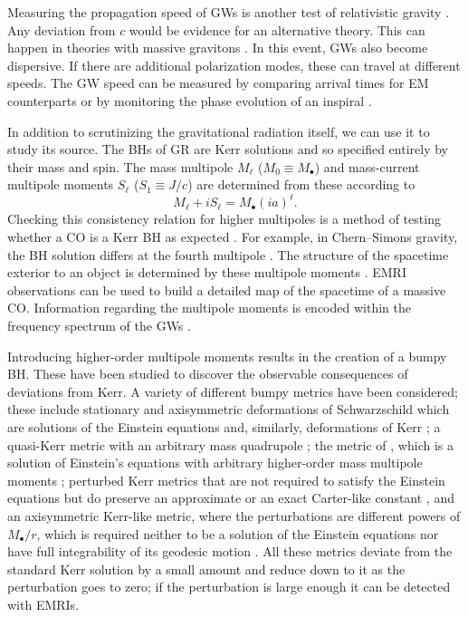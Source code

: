 Measuring the propagation speed of GWs is another test of relativistic gravity \citep[section 10.1]{Will1993}. Any deviation from $c$ would be evidence for an alternative theory. This can happen in theories with massive gravitons \citep{Babak2003,Goldhaber2010}. In this event, GWs also become dispersive. If there are additional polarization modes, these can travel at different speeds. The GW speed can be measured by comparing arrival times for EM counterparts \citep[e.g.,][]{Cooray2004,Kocsis2008} or by monitoring the phase evolution of an inspiral \citep{Will1998,Berti2011}.

In addition to scrutinizing the gravitational radiation itself, we can use it to study its source. The BHs of GR are Kerr solutions and so specified entirely by their mass and spin. The mass multipole $M_\ell$ ($M_0 \equiv M_\bullet$) and mass-current multipole moments $S_\ell$ ($S_1 \equiv J/c$) are determined from these according to \citep{Hansen1974}
\begin{equation}
M_\ell + iS_\ell = M_\bullet \left(ia\right)^\ell.
\end{equation}
Checking this consistency relation for higher multipoles is a method of testing whether a CO is a Kerr BH as expected \citep{Gair2012}. For example, in Chern--Simons gravity, the BH solution differs at the fourth multipole \citep{Sopuerta2009a}.  The structure of the spacetime exterior to an object is determined by these multipole moments \citep{Geroch1970}. EMRI observations can be used to build a detailed map of the spacetime of a massive CO. Information regarding the multipole moments is encoded within the frequency spectrum of the GWs \citep{Ryan1995,Ryan1997}.

Introducing higher-order multipole moments results in the creation of a bumpy BH. These have been studied to discover the observable consequences of deviations from Kerr. A variety of different bumpy metrics have been considered; these include stationary and axisymmetric deformations of Schwarzschild which are solutions of the Einstein equations \citep{Collins2004} and, similarly, deformations of Kerr \citep{Vigeland2010a}; a quasi-Kerr metric with an arbitrary mass quadrupole \citep{Glampedakis2006a,Barack2007}; the metric of \citet{Manko1992}, which is a solution of Einstein's equations with arbitrary higher-order mass multipole moments \citep{Gair2008}; perturbed Kerr metrics that are not required to satisfy the Einstein equations but do preserve an approximate or an exact Carter-like constant \citep{Vigeland2011,Gair2011,Johannsen2013b}, and an axisymmetric Kerr-like metric, where the perturbations are different powers of $M_\bullet/r$, which is required neither to be a solution of the Einstein equations nor have full integrability of its geodesic motion \citep{Johannsen2011}. All these metrics deviate from the standard Kerr solution by a small amount and reduce down to it as the perturbation goes to zero; if the perturbation is large enough it can be detected with EMRIs.

